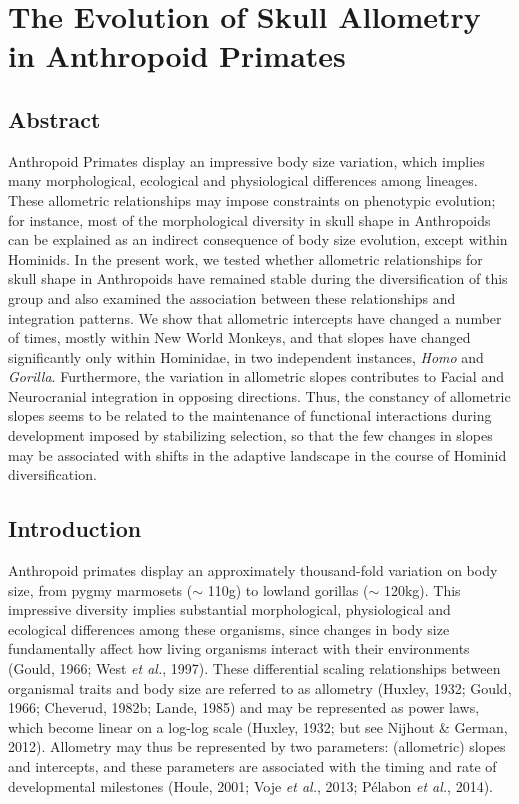 \documentclass[12pt,twoside]{report}
\begin{document}
\newpage
\chapter{The Evolution of Skull Allometry in Anthropoid Primates}
\label{ch:allo}

\section{Abstract}\label{abstract-1}

Anthropoid Primates display an impressive body size variation, which
implies many morphological, ecological and physiological differences
among lineages. These allometric relationships may impose constraints on
phenotypic evolution; for instance, most of the morphological diversity
in skull shape in Anthropoids can be explained as an indirect
consequence of body size evolution, except within Hominids. In the
present work, we tested whether allometric relationships for skull shape
in Anthropoids have remained stable during the diversification of this
group and also examined the association between these relationships and
integration patterns. We show that allometric intercepts have changed a
number of times, mostly within New World Monkeys, and that slopes have
changed significantly only within Hominidae, in two independent
instances, \emph{Homo} and \emph{Gorilla}. Furthermore, the variation in
allometric slopes contributes to Facial and Neurocranial integration in
opposing directions. Thus, the constancy of allometric slopes seems to
be related to the maintenance of functional interactions during
development imposed by stabilizing selection, so that the few changes in
slopes may be associated with shifts in the adaptive landscape in the
course of Hominid diversification.

\newpage

\section{Introduction}\label{introduction-1}

Anthropoid primates display an approximately thousand-fold variation on
body size, from pygmy marmosets ($\sim$ 110g) to lowland gorillas
($\sim$ 120kg). This impressive diversity implies substantial
morphological, physiological and ecological differences among these
organisms, since changes in body size fundamentally affect how living
organisms interact with their environments (Gould, 1966; West \emph{et
al.}, 1997). These differential scaling relationships between organismal
traits and body size are referred to as allometry (Huxley, 1932; Gould,
1966; Cheverud, 1982b; Lande, 1985) and may be represented as power
laws, which become linear on a log-log scale (Huxley, 1932; but see
Nijhout \& German, 2012). Allometry may thus be represented by two
parameters: (allometric) slopes and intercepts, and these parameters are
associated with the timing and rate of developmental milestones (Houle,
2001; Voje \emph{et al.}, 2013; Pélabon \emph{et al.}, 2014).
\end{document}
